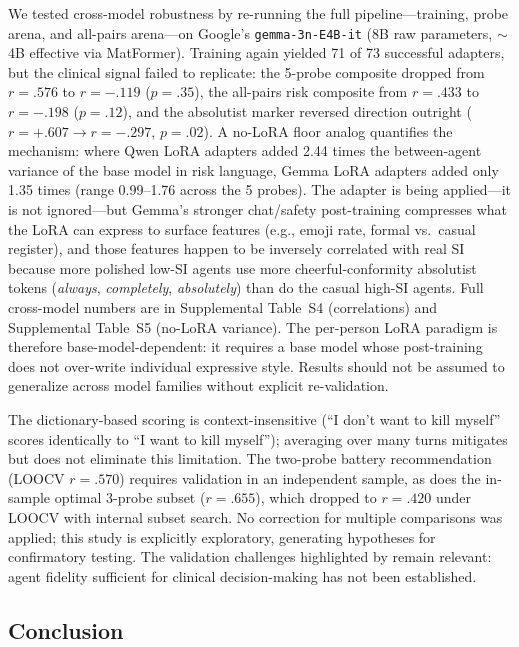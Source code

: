 \documentclass[review,12pt,authoryear]{elsarticle}
\begin{document}
We tested cross-model robustness by re-running the full pipeline---training, probe arena, and all-pairs arena---on Google's \texttt{gemma-3n-E4B-it} (8B raw parameters, $\sim$4B effective via MatFormer). Training again yielded 71 of 73 successful adapters, but the clinical signal failed to replicate: the 5-probe composite dropped from $r = .576$ to $r = -.119$ ($p = .35$), the all-pairs risk composite from $r = .433$ to $r = -.198$ ($p = .12$), and the absolutist marker reversed direction outright ($r = +.607 \rightarrow r = -.297$, $p = .02$). A no-LoRA floor analog quantifies the mechanism: where Qwen LoRA adapters added 2.44 times the between-agent variance of the base model in risk language, Gemma LoRA adapters added only 1.35 times (range 0.99--1.76 across the 5 probes). The adapter is being applied---it is not ignored---but Gemma's stronger chat/safety post-training compresses what the LoRA can express to surface features (e.g., emoji rate, formal vs.\ casual register), and those features happen to be inversely correlated with real SI because more polished low-SI agents use more cheerful-conformity absolutist tokens (\textit{always}, \textit{completely}, \textit{absolutely}) than do the casual high-SI agents. Full cross-model numbers are in Supplemental Table~S4 (correlations) and Supplemental Table~S5 (no-LoRA variance). The per-person LoRA paradigm is therefore base-model-dependent: it requires a base model whose post-training does not over-write individual expressive style. Results should not be assumed to generalize across model families without explicit re-validation. 

The dictionary-based scoring is context-insensitive (``I don't want to kill myself'' scores identically to ``I want to kill myself''); averaging over many turns mitigates but does not eliminate this limitation. The two-probe battery recommendation (LOOCV $r = .570$) requires validation in an independent sample, as does the in-sample optimal 3-probe subset ($r = .655$), which dropped to $r = .420$ under LOOCV with internal subset search. No correction for multiple comparisons was applied; this study is explicitly exploratory, generating hypotheses for confirmatory testing. The validation challenges highlighted by \citet{tornberg2025validation} remain relevant: agent fidelity sufficient for clinical decision-making has not been established.

\subsection{Conclusion}
\end{document}
